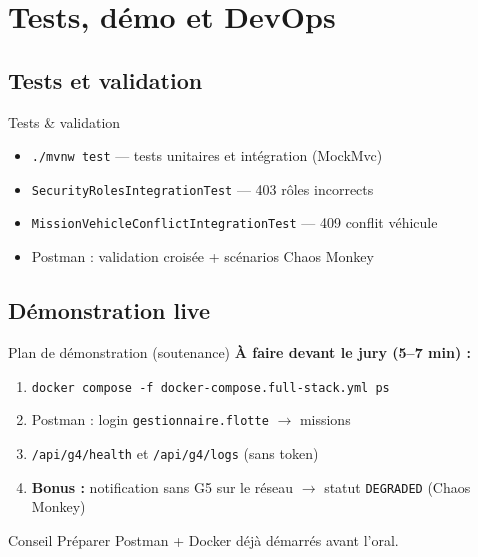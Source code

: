 \documentclass[aspectratio=169,xcolor=table]{beamer}
\begin{document}
\section{Tests, démo et DevOps}

\subsection{Tests et validation}

\begin{frame}{Tests \& validation}
  \begin{itemize}
    \item \texttt{./mvnw test} — tests unitaires et intégration (MockMvc)
    \item \texttt{SecurityRolesIntegrationTest} — 403 rôles incorrects
    \item \texttt{MissionVehicleConflictIntegrationTest} — 409 conflit véhicule
    \item Postman : validation croisée + scénarios Chaos Monkey
  \end{itemize}
\end{frame}

\subsection{Démonstration live}

\begin{frame}{Plan de démonstration (soutenance)}
  \textbf{À faire devant le jury (5--7 min) :}
  \begin{enumerate}
    \item \texttt{docker compose -f docker-compose.full-stack.yml ps}
    \item Postman : login \texttt{gestionnaire.flotte} $\rightarrow$ missions
    \item \texttt{/api/g4/health} et \texttt{/api/g4/logs} (sans token)
    \item \textbf{Bonus :} notification sans G5 sur le réseau $\rightarrow$ statut \texttt{DEGRADED} (Chaos Monkey)
  \end{enumerate}
  \vspace{0.2cm}
  \begin{alertblock}{Conseil}
    Préparer Postman + Docker déjà démarrés avant l'oral.
  \end{alertblock}
\end{frame}
\end{document}
